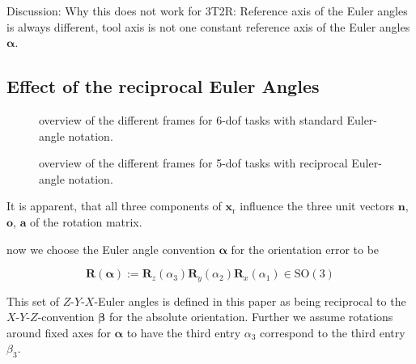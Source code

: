 \documentclass[twocolumn,10pt]{IFTOMM}
\newcommand{\bm}[1]{\boldsymbol{#1}}
\newcommand{\vek}[3]{\boldsymbol{#1}^{#2}_{#3}}
\newcommand{\rotmat}[2]{{{ }^{#1}\boldsymbol{R}}_{#2}}
\newcommand{\transp}[0]{{\mathrm{T}}}
\begin{document}
Discussion: Why this does not work for 3T2R: Reference axis of the Euler angles is always different, tool axis is not one constant reference axis of the Euler angles $\bm{\alpha}$.

\subsection{Effect of the reciprocal Euler Angles}
\label{sec:RecEulAng_effect}

\begin{figure}[tb!]
    
    \caption{overview of the different frames for 6-dof tasks with standard Euler-angle notation.}
    \label{fig:frames_6dof}
\end{figure} 


\begin{figure}[tb!]
    
    \caption{overview of the different frames for 5-dof tasks with reciprocal Euler-angle notation.}
    \label{fig:frames_5dof}
\end{figure} 



It is apparent, that all three components of $\bm{x}_{\mathrm{r}}$ influence the three unit vectors $\bm{n}$, $\bm{o}$, $\bm{a}$ of the rotation matrix.

now we choose the Euler angle convention $\bm{\alpha}$ for the orientation error to be 

\begin{equation}
\bm{R}(\bm{\alpha}) := \bm{R}_z(\alpha_3) \bm{R}_y(\alpha_2) \bm{R}_x(\alpha_1) \in \mathrm{SO(3)}
\label{equ:def_rmat_zyxr}
\end{equation}

This set of $Z$-$Y$-$X$-Euler angles is defined in this paper as being reciprocal to the $X$-$Y$-$Z$-convention $\bm{\beta}$ for the absolute orientation.
Further we assume rotations around fixed axes for $\bm{\alpha}$ to have the third entry $\alpha_3$ correspond to the third entry $\beta_3$.
\end{document}
